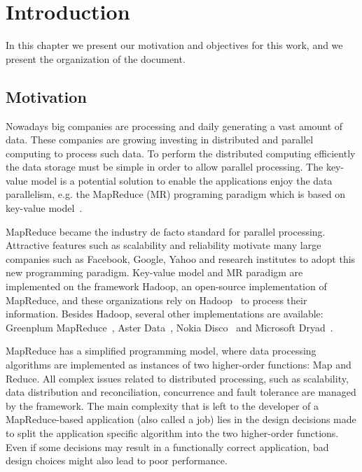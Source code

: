 \chapter{Introduction} %
\label{cha:introduction}

In this chapter we present our motivation and objectives for this work, and we
present the organization of the document.

\section{Motivation}

Nowadays big companies are processing and daily generating a vast amount of data.
These companies are growing investing in distributed and parallel computing
to process such data. To perform the distributed computing efficiently the data
storage must be simple in order to allow parallel processing. The key-value model
is a potential solution to enable the applications enjoy the data parallelism,
e.g. the MapReduce (MR)  programing paradigm which is based on key-value model~\cite{Dean:2004}.

MapReduce became the industry de facto standard for parallel processing.
Attractive features such as scalability and reliability motivate many large companies
such as Facebook, Google, Yahoo and research institutes to adopt this new programming
paradigm. Key-value model and MR paradigm are implemented on the framework Hadoop,
an open-source implementation of MapReduce, and these organizations rely
on Hadoop~\cite{White:2009} to process their information. Besides Hadoop, several
other implementations are available: Greenplum MapReduce~\cite{PivotalGreenplum:2008, Greenplum:2008},
Aster Data~\cite{Aster:2011}, Nokia Disco~\cite{Mundkur:2011} and
Microsoft Dryad~\cite{Isard:2007}.

MapReduce has a simplified programming model, where data processing algorithms 
are implemented as instances of two higher-order functions: Map and Reduce. All 
complex issues related to distributed processing, such as scalability, data
distribution and reconciliation, concurrence and fault tolerance are managed
by the framework. The main complexity that is left to the developer of a 
MapReduce-based application (also called a job) lies in the design decisions made 
to split the application specific algorithm into the two higher-order functions.
Even if some decisions may result in a functionally correct application, bad design
choices might also lead to poor performance.

